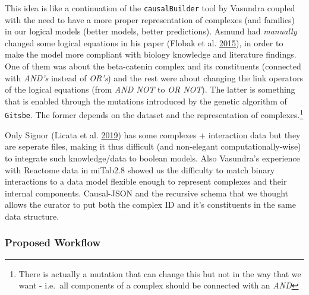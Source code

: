 \documentclass[
  12pt,
]{book}
\begin{document}
This idea is like a continuation of the \texttt{causalBuilder} tool by Vasundra coupled with the need to have a more proper representation of complexes (and families) in our logical models (better models, better predictions).
Asmund had \emph{manually} changed some logical equations in his paper (Flobak et al. \protect\hyperlink{ref-Flobak2015}{2015}), in order to make the model more compliant with biology knowledge and literature findings.
One of them was about the beta-catenin complex and its constituents (connected with \emph{AND's} instead of \emph{OR's}) and the rest were about changing the link operators of the logical equations (from \emph{AND NOT} to \emph{OR NOT}).
The latter is something that is enabled through the mutations introduced by the genetic algorithm of \texttt{Gitsbe}.
The former depends on the dataset and the representation of complexes.\footnote{There is actually a mutation that can change this but not in the way that we want - i.e.~all components of a complex should be connected with an \emph{AND}}

Only Signor (Licata et al. \protect\hyperlink{ref-Licata2019}{2019}) has some complexes + interaction data but they are seperate files, making it thus difficult (and non-elegant computationally-wise) to integrate such knowledge/data to boolean models.
Also Vasundra's experience with Reactome data in miTab2.8 showed us the difficulty to match binary interactions to a data model flexible enough to represent complexes and their internal components. Causal-JSON and the recursive schema that we thought allows the curator to put both the complex ID and it's constituents in the same data structure.

\hypertarget{proposed-workflow}{%
\subsubsection*{Proposed Workflow}\label{proposed-workflow}}
\end{document}
